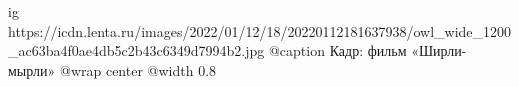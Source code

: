  
 
 
 
 

\ifcmt
  ig https://icdn.lenta.ru/images/2022/01/12/18/20220112181637938/owl_wide_1200_ac63ba4f0ae4db5c2b43c6349d7994b2.jpg
  @caption Кадр: фильм «Ширли-мырли»
  @wrap center
  @width 0.8
\fi
